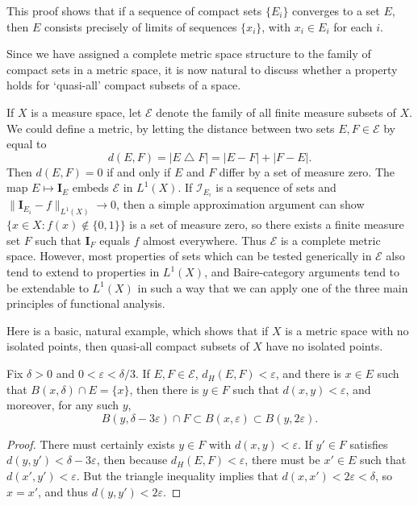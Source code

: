 \begin{remark}
	This proof shows that if a sequence of compact sets $\{ E_i \}$ converges to a set $E$, then $E$ consists precisely of limits of sequences $\{ x_i \}$, with $x_i \in E_i$ for each $i$.
\end{remark}

Since we have assigned a complete metric space structure to the family of compact sets in a metric space, it is now natural to discuss whether a property holds for `quasi-all' compact subsets of a space.

\begin{remark}
	If $X$ is a measure space, let $\mathcal{E}$ denote the family of all finite measure subsets of $X$. We could define a metric, by letting the distance between two sets $E,F \in \mathcal{E}$ by equal to
	\[ d(E,F) = |E \bigtriangleup F| = |E - F| + |F - E|. \]
	Then $d(E,F) = 0$ if and only if $E$ and $F$ differ by a set of measure zero. The map $E \mapsto \mathbf{I}_E$ embeds $\mathcal{E}$ in $L^1(X)$. If $\mathcal{I}_{E_i}$ is a sequence of sets and $\| \mathbf{I}_{E_i} - f \|_{L^1(X)} \to 0$, then a simple approximation argument can show $\{ x \in X: f(x) \not \in \{ 0, 1 \} \}$ is a set of measure zero, so there exists a finite measure set $F$ such that $\mathbf{I}_F$ equals $f$ almost everywhere. Thus $\mathcal{E}$ is a complete metric space. However, most properties of sets which can be tested generically in $\mathcal{E}$ also tend to extend to properties in $L^1(X)$, and Baire-category arguments tend to be extendable to $L^1(X)$ in such a way that we can apply one of the three main principles of functional analysis.
\end{remark}

Here is a basic, natural example, which shows that if $X$ is a metric space with no isolated points, then quasi-all compact subsets of $X$ have no isolated points.

\begin{lemma}
	Fix $\delta > 0$ and $0 < \varepsilon < \delta/3$. If $E,F \in \mathcal{E}$, $d_H(E,F) < \varepsilon$, and there is $x \in E$ such that $B(x,\delta) \cap E = \{ x \}$, then there is $y \in F$ such that $d(x,y) < \varepsilon$, and moreover, for any such $y$,
	\[ B(y,\delta - 3\varepsilon) \cap F \subset B(x,\varepsilon) \subset B(y,2\varepsilon). \]
\end{lemma}
\begin{proof}
	There must certainly exists $y \in F$ with $d(x,y) < \varepsilon$. If $y' \in F$ satisfies $d(y,y') < \delta - 3\varepsilon$, then because $d_H(E,F) < \varepsilon$, there must be $x' \in E$ such that $d(x',y') < \varepsilon$. But the triangle inequality implies that $d(x,x') < 2\varepsilon < \delta$, so $x = x'$, and thus $d(y,y') < 2\varepsilon$.
\end{proof}

